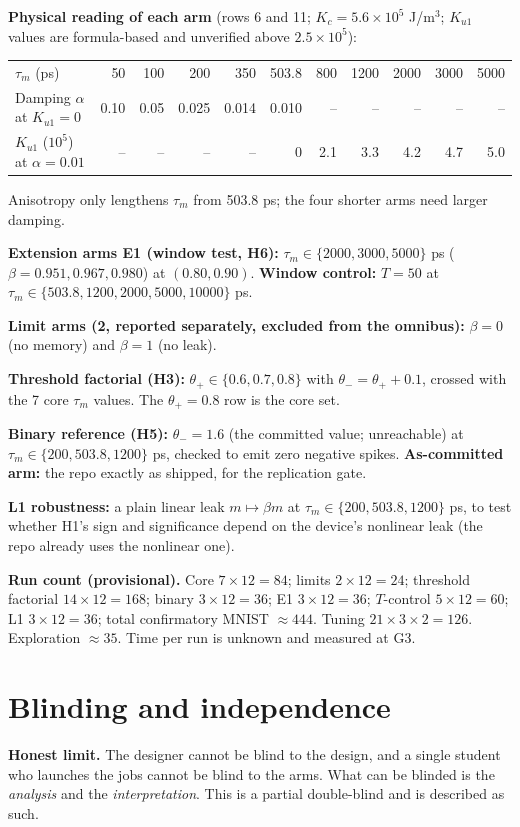 \documentclass[10pt,a4paper]{article}
\newcommand{\taum}{\tau_m}
\begin{document}
\textbf{Physical reading of each arm} (rows 6 and 11; $K_c=5.6\times10^5$ J/m$^3$; $K_{u1}$ values are formula-based and unverified above $2.5\times10^5$):
\begin{center}\footnotesize
\begin{tabular}{@{}lrrrrrrrrrr@{}}
\toprule $\taum$ (ps) & 50 & 100 & 200 & 350 & 503.8 & 800 & 1200 & 2000 & 3000 & 5000\\
Damping $\alpha$ at $K_{u1}=0$ & 0.10 & 0.05 & 0.025 & 0.014 & 0.010 & -- & -- & -- & -- & --\\
$K_{u1}$ ($10^5$) at $\alpha=0.01$ & -- & -- & -- & -- & 0 & 2.1 & 3.3 & 4.2 & 4.7 & 5.0\\ \bottomrule
\end{tabular}
\end{center}
Anisotropy only lengthens $\taum$ from 503.8 ps; the four shorter arms need larger damping.

\textbf{Extension arms E1 (window test, H6):} $\taum\in\{2000,3000,5000\}$ ps ($\beta=0.951,0.967,0.980$) at $(0.80,0.90)$. \textbf{Window control:} $T=50$ at $\taum\in\{503.8,1200,2000,5000,10000\}$ ps.

\textbf{Limit arms (2, reported separately, excluded from the omnibus):} $\beta=0$ (no memory) and $\beta=1$ (no leak).

\textbf{Threshold factorial (H3):} $\theta_+\in\{0.6,0.7,0.8\}$ with $\theta_-=\theta_++0.1$, crossed with the 7 core $\taum$ values. The $\theta_+=0.8$ row is the core set.

\textbf{Binary reference (H5):} $\theta_-=1.6$ (the committed value; unreachable) at $\taum\in\{200,503.8,1200\}$ ps, checked to emit zero negative spikes. \textbf{As-committed arm:} the repo exactly as shipped, for the replication gate.

\textbf{L1 robustness:} a plain linear leak $m\mapsto\beta m$ at $\taum\in\{200,503.8,1200\}$ ps, to test whether H1's sign and significance depend on the device's nonlinear leak (the repo already uses the nonlinear one).

\textbf{Run count (provisional).} Core $7\times12=84$; limits $2\times12=24$; threshold factorial $14\times12=168$; binary $3\times12=36$; E1 $3\times12=36$; $T$-control $5\times12=60$; L1 $3\times12=36$; total confirmatory MNIST $\approx444$. Tuning $21\times3\times2=126$. Exploration $\approx35$. Time per run is unknown and measured at G3.

\section{Blinding and independence}\label{sec:blind}
\textbf{Honest limit.} The designer cannot be blind to the design, and a single student who launches the jobs cannot be blind to the arms. What can be blinded is the \emph{analysis} and the \emph{interpretation}. This is a partial double-blind and is described as such.
\end{document}
